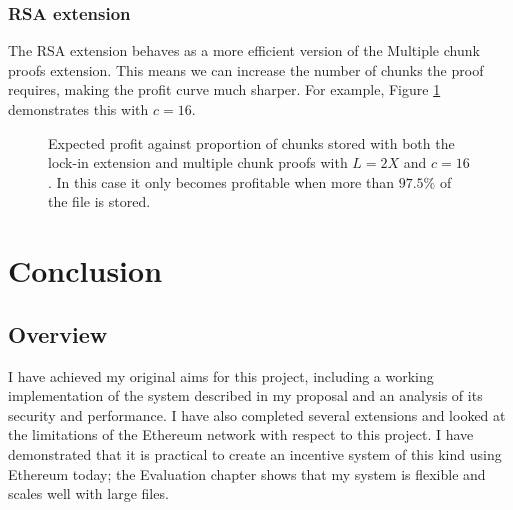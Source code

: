 \documentclass[12pt,a4paper,twoside,openright]{report}
\begin{document}
\subsection{RSA extension}

The RSA extension behaves as a more efficient version of the Multiple chunk proofs extension.
This means we can increase the number of chunks the proof requires, making the profit curve much sharper.
For example, Figure \ref{eval-graph-RSA} demonstrates this with $c = 16$.

\begin{figure}[H]

\caption[Expected attacker profit: erasure code]{Expected profit against proportion of chunks stored with both the lock-in extension and multiple chunk proofs with $L = 2X$ and $c = 16$.
In this case it only becomes profitable when more than $97.5\%$ of the file is stored.}
\label{eval-graph-RSA}
\end{figure}


\chapter{Conclusion}

\section{Overview}
I have achieved my original aims for this project,
including a working implementation of the system described in my proposal and an analysis of its security and performance.
I have also completed several extensions and looked at the limitations of the Ethereum network with respect to this project.
I have demonstrated that it is practical to create an incentive system of this kind using Ethereum today;
the Evaluation chapter shows that my system is flexible and scales well with large files.
\end{document}
